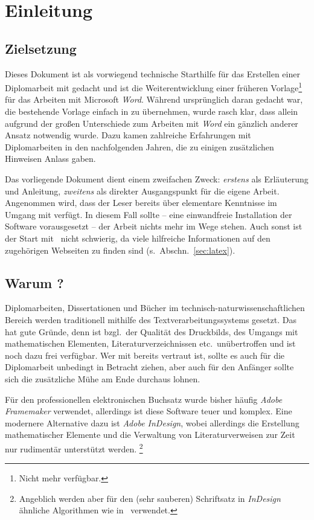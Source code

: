 \chapter{Einleitung}
\label{cha:Einleitung}

\section{Zielsetzung}
Dieses Dokument ist als vorwiegend technische Starthilfe für das
Erstellen einer Diplomarbeit mit \latex
gedacht und ist die Weiterentwicklung einer früheren
Vorlage\footnote{Nicht mehr verfügbar.} für das Arbeiten mit
Microsoft \emph{Word}. Während ursprünglich daran gedacht war, die
bestehende Vorlage einfach in \latex zu übernehmen, wurde rasch
klar, dass allein aufgrund der großen Unterschiede zum Arbeiten
mit \emph{Word} ein gänzlich anderer Ansatz notwendig wurde. Dazu
kamen zahlreiche Erfahrungen mit Diplomarbeiten in den
nachfolgenden Jahren, die zu einigen zusätzlichen Hinweisen Anlass gaben.

Das vorliegende Dokument dient einem zweifachen Zweck: 
\emph{erstens} als Erläuterung und Anleitung, \emph{zweitens} als
direkter Ausgangspunkt für die eigene Arbeit. Angenommen wird,
dass der Leser bereits über elementare Kenntnisse im Umgang mit
\latex verfügt. In diesem Fall sollte -- eine einwandfreie
Installation der Software vorausgesetzt -- der Arbeit nichts mehr
im Wege stehen. Auch sonst ist der Start mit \latex\ nicht
schwierig, da viele hilfreiche Informationen auf den zugehörigen
Webseiten zu finden sind (s.\ Abschn.~\ref{sec:latex}).





\section{Warum {\latex}?}

Diplomarbeiten, Dissertationen und Bücher im
technisch-natur\-wissen\-schaft\-lichen Bereich werden
traditionell mithilfe des Textverarbeitungssystems \latex
\cite{Lamport94,Lamport95} gesetzt. Das hat gute Gründe, denn
\latex ist bzgl.\ der Qualität des Druckbilds, des Umgangs mit
mathematischen Elementen, Literaturverzeichnissen etc.\
unübertroffen und ist noch dazu frei verfügbar. Wer mit \latex
bereits vertraut ist, sollte es auch für die Diplomarbeit
unbedingt in Betracht ziehen, aber auch für den Anfänger sollte
sich die zusätzliche Mühe am Ende durchaus lohnen.

Für den professionellen elektronischen Buchsatz wurde bisher
häufig \emph{Adobe Framemaker} verwendet, allerdings ist diese
Software teuer und komplex. Eine modernere Alternative dazu ist
\emph{Adobe InDesign}, wobei allerdings die Erstellung
mathematischer Elemente und die Verwaltung von Literaturverweisen
zur Zeit nur rudimentär unterstützt werden.%
\footnote{Angeblich werden aber für den (sehr sauberen) Schriftsatz 
in \emph{InDesign} ähnliche Algorithmen wie in \latex\ verwendet.}

